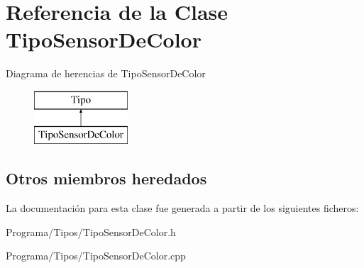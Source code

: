 \hypertarget{class_tipo_sensor_de_color}{\section{Referencia de la Clase Tipo\-Sensor\-De\-Color}
\label{class_tipo_sensor_de_color}
}
Diagrama de herencias de Tipo\-Sensor\-De\-Color\begin{figure}[H]
\begin{center}
\leavevmode
\includegraphics[height=2.000000cm]{class_tipo_sensor_de_color}
\end{center}
\end{figure}
\subsection*{Otros miembros heredados}


La documentación para esta clase fue generada a partir de los siguientes ficheros\-:\begin{DoxyCompactItemize}
\item 
Programa/\-Tipos/Tipo\-Sensor\-De\-Color.\-h\item 
Programa/\-Tipos/Tipo\-Sensor\-De\-Color.\-cpp\end{DoxyCompactItemize}

